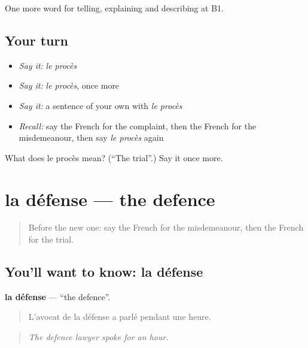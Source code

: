 \begin{grammarlens}[title={What you've built}]
One more word for telling, explaining and describing at B1.
\end{grammarlens}

\subsection*{Your turn}
\begin{itemize}
\raggedright
  \item \emph{Say it:} \emph{le procès}
  \item \emph{Say it:} \emph{le procès}, once more
  \item \emph{Say it:} a sentence of your own with \emph{le procès}
  \item \emph{Recall:} say the French for the complaint, then the French for the misdemeanour, then say \emph{le procès} again
\end{itemize}

\begin{tcolorbox}[breakable,colback=teal!4,colframe=teal!35!black,title={Before you move on}]
What does le procès mean? (\textquotedblleft{}The trial\textquotedblright{}.) Say it once more.
\end{tcolorbox}
\section[la défense]{la défense — the defence}

\label{lesson:FR-C387-defense}



\begin{quote}
Before the new one: say the French for the misdemeanour, then the French for the trial.
\end{quote}

\subsection*{You'll want to know: la défense}
\textbf{la défense} — \textquotedblleft{}the defence\textquotedblright{}.

\begin{quote}
L'avocat de la défense a parlé pendant une heure.
\end{quote}

\begin{quote}
\emph{The defence lawyer spoke for an hour.}
\end{quote}

